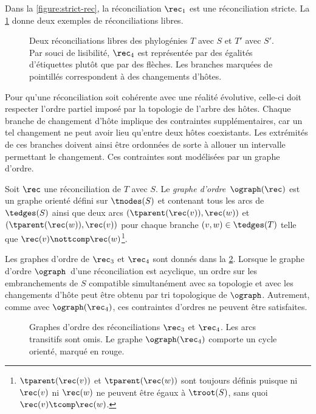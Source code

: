 Dans la \cref{figure:strict-rec}, la réconciliation \(\rec_1\) est une réconciliation stricte.
La \cref{figure:free-rec} donne deux exemples de réconciliations libres.

\begin{figure}[htb]
    \capstart
    \centering
    
    \caption{
        Deux réconciliations libres des phylogénies \(T\) avec \(S\) et \(T'\) avec \(S'\).
        Par souci de lisibilité, \(\rec_4\) est représentée par des égalités d’étiquettes plutôt que par des flèches.
        Les branches marquées de pointillés correspondent à des changements d’hôtes.
    }
    \label{figure:free-rec}
\end{figure}

Pour qu’une réconciliation soit cohérente avec une réalité évolutive, celle-ci doit respecter l’ordre partiel imposé par la topologie de l’arbre des hôtes.
Chaque branche de changement d’hôte implique des contraintes supplémentaires, car un tel changement ne peut avoir lieu qu’entre deux hôtes coexistants.
Les extrémités de ces branches doivent ainsi être ordonnées de sorte à allouer un intervalle permettant le changement.
Ces contraintes sont modélisées par un graphe d’ordre.

\begin{definition}\label{definition:rec-order}
    Soit \(\rec\) une réconciliation de \(T\) avec \(S\).
    Le \emph{graphe d’ordre}~\(\ograph(\rec)\) est un graphe orienté
    défini sur \(\tnodes(S)\)
    et contenant tous les arcs de \(\tedges(S)\)
    ainsi que deux arcs \((\tparent(\rec(v)), \rec(w))\) et \((\tparent(\rec(w)), \rec(v))\)
    pour chaque branche \((v, w) \in \tedges(T)\) telle que \(\rec(v) \nottcomp \rec(w)\)\footnote{
        \(\tparent(\rec(v))\) et \(\tparent(\rec(w))\) sont toujours définis puisque ni \(\rec(v)\) ni \(\rec(w)\) ne peuvent être égaux à \(\troot(S)\), sans quoi \(\rec(v) \tcomp \rec(w)\).
    }.
\end{definition}

Les graphes d’ordre de \(\rec_3\) et \(\rec_4\) sont donnés dans la \cref{figure:order-graph}.
Lorsque le graphe d’ordre \(\ograph\)\, d’une réconciliation est acyclique, un ordre sur les embranchements de \(S\) compatible simultanément avec sa topologie et avec les changements d’hôte peut être obtenu par tri topologique de \(\ograph\).
Autrement, comme avec \(\ograph(\rec_4)\), ces contraintes d’ordres ne peuvent être satisfaites.

\begin{figure}[htb]
    \capstart
    \centering
    
    \caption{
        Graphes d’ordre des réconciliations \(\rec_3\) et \(\rec_4\).
        Les arcs transitifs sont omis.
        Le graphe \(\ograph(\rec_4)\) comporte un cycle orienté, marqué en rouge.
    }
    \label{figure:order-graph}
\end{figure}


